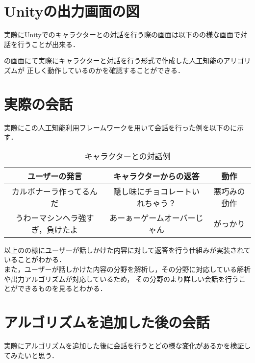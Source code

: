 
\section{Unityの出力画面の図}
実際にUnityでのキャラクターとの対話を行う際の画面は以下のの様な画面で対話を行うことが出来る．


の画面にて実際にキャラクターと対話を行う形式で作成した人工知能のアリゴリズムが
正しく動作しているのかを確認することができる．\\


\section{実際の会話}
実際にこの人工知能利用フレームワークを用いて会話を行った例を以下のに示す．\\

\begin{table}[tbh]
	\caption{キャラクターとの対話例} \label{tab:Chat}
	\begin{center}
		\begin{tabular}[htb]{c|c|c}
		\hline
		ユーザーの発言 & キャラクターからの返答 & 動作 \\
		\hline
		カルボナーラ作ってるんだ & 隠し味にチョコレートいれちゃう？ & 悪巧みの動作 \\
		うわーマシンヘラ強すぎ，負けたよ & あーぁーゲームオーバーじゃん & がっかり \\
		\hline
		\end{tabular}
	\end{center}
\end{table}

以上のの様にユーザーが話しかけた内容に対して返答を行う仕組みが実装されていることがわかる．\\

また，ユーザーが話しかけた内容の分野を解析し，その分野に対応している解析や出力アルゴリズムが対応しているため，
その分野のより詳しい会話を行うことができるものを見るとわかる．\\


\section{アルゴリズムを追加した後の会話}\label{sec:addAl}
実際にアルゴリズムを追加した後に会話を行うとどの様な変化があるかを検証してみたいと思う．\\

